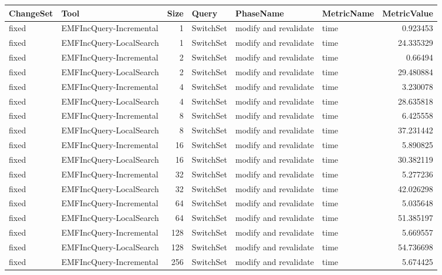 \begin{table}
\centering
\footnotesize
\begin{tabular}{| l | l | r | l | l | l | r |}
\hline
\sf ChangeSet & \sf Tool & \sf Size & \sf Query & \sf PhaseName & \sf MetricName & \sf MetricValue\\\hline


fixed & EMFIncQuery-Incremental & 1 & SwitchSet & modify and revalidate & time & 0.923453\\\hline
fixed & EMFIncQuery-LocalSearch & 1 & SwitchSet & modify and revalidate & time & 24.335329\\\hline
fixed & EMFIncQuery-Incremental & 2 & SwitchSet & modify and revalidate & time & 0.66494\\\hline
fixed & EMFIncQuery-LocalSearch & 2 & SwitchSet & modify and revalidate & time & 29.480884\\\hline
fixed & EMFIncQuery-Incremental & 4 & SwitchSet & modify and revalidate & time & 3.230078\\\hline
fixed & EMFIncQuery-LocalSearch & 4 & SwitchSet & modify and revalidate & time & 28.635818\\\hline
fixed & EMFIncQuery-Incremental & 8 & SwitchSet & modify and revalidate & time & 6.425558\\\hline
fixed & EMFIncQuery-LocalSearch & 8 & SwitchSet & modify and revalidate & time & 37.231442\\\hline
fixed & EMFIncQuery-Incremental & 16 & SwitchSet & modify and revalidate & time & 5.890825\\\hline
fixed & EMFIncQuery-LocalSearch & 16 & SwitchSet & modify and revalidate & time & 30.382119\\\hline
fixed & EMFIncQuery-Incremental & 32 & SwitchSet & modify and revalidate & time & 5.277236\\\hline
fixed & EMFIncQuery-LocalSearch & 32 & SwitchSet & modify and revalidate & time & 42.026298\\\hline
fixed & EMFIncQuery-Incremental & 64 & SwitchSet & modify and revalidate & time & 5.035648\\\hline
fixed & EMFIncQuery-LocalSearch & 64 & SwitchSet & modify and revalidate & time & 51.385197\\\hline
fixed & EMFIncQuery-Incremental & 128 & SwitchSet & modify and revalidate & time & 5.669557\\\hline
fixed & EMFIncQuery-LocalSearch & 128 & SwitchSet & modify and revalidate & time & 54.736698\\\hline
fixed & EMFIncQuery-Incremental & 256 & SwitchSet & modify and revalidate & time & 5.674425\\\hline

\end{tabular}
\end{table}
